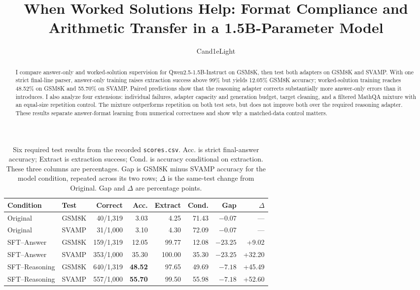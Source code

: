 \documentclass[11pt]{article}
\title{When Worked Solutions Help: Format Compliance and Arithmetic Transfer in a 1.5B-Parameter Model}
\author{Cand1eLight}
\date{}
\begin{document}
\maketitle

\begin{abstract}
I compare answer-only and worked-solution supervision for Qwen2.5-1.5B-Instruct on GSM8K, then test both adapters on GSM8K and SVAMP. With one strict final-line parser, answer-only training raises extraction success above 99\% but yields 12.05\% GSM8K accuracy; worked-solution training reaches 48.52\% on GSM8K and 55.70\% on SVAMP. Paired predictions show that the reasoning adapter corrects substantially more answer-only errors than it introduces. I also analyze four extensions: individual failures, adapter capacity and generation budget, target cleaning, and a filtered MathQA mixture with an equal-size repetition control. The mixture outperforms repetition on both test sets, but does not improve both over the required reasoning adapter. These results separate answer-format learning from numerical correctness and show why a matched-data control matters.
\end{abstract}

\begin{table}[t]
\centering
\footnotesize
\setlength{\tabcolsep}{3.7pt}
\begin{tabular}{@{}llrrrrrr@{}}
\toprule
Condition & Test & Correct & Acc. & Extract & Cond. & Gap & $\Delta$ \\
\midrule
Original & GSM8K & 40/1,319 & 3.03 & 4.25 & 71.43 & $-0.07$ & --- \\
Original & SVAMP & 31/1,000 & 3.10 & 4.30 & 72.09 & $-0.07$ & --- \\
SFT--Answer & GSM8K & 159/1,319 & 12.05 & 99.77 & 12.08 & $-23.25$ & +9.02 \\
SFT--Answer & SVAMP & 353/1,000 & 35.30 & 100.00 & 35.30 & $-23.25$ & +32.20 \\
SFT--Reasoning & GSM8K & 640/1,319 & \textbf{48.52} & 97.65 & 49.69 & $-7.18$ & +45.49 \\
SFT--Reasoning & SVAMP & 557/1,000 & \textbf{55.70} & 99.50 & 55.98 & $-7.18$ & +52.60 \\
\bottomrule
\end{tabular}
\caption{Six required test results from the recorded \texttt{scores.csv}. Acc. is strict final-answer accuracy; Extract is extraction success; Cond. is accuracy conditional on extraction. These three columns are percentages. Gap is GSM8K minus SVAMP accuracy for the model condition, repeated across its two rows; $\Delta$ is the same-test change from Original. Gap and $\Delta$ are percentage points.}
\label{tab:main}
\end{table}
\end{document}
